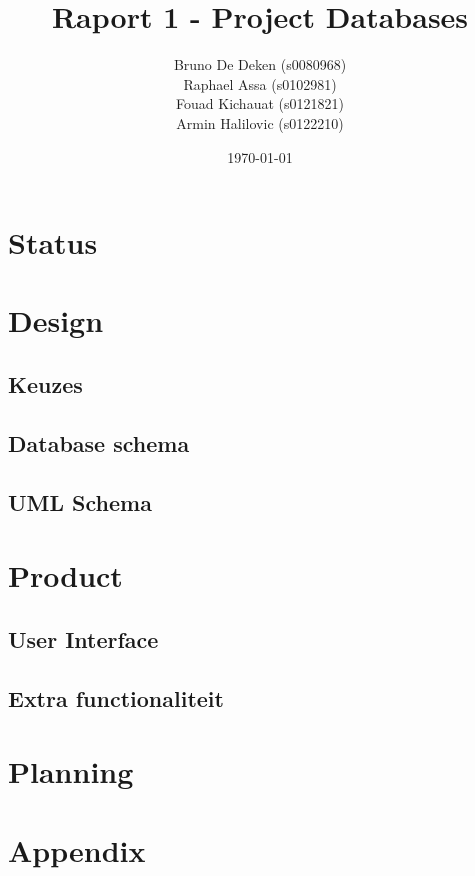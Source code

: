 \documentclass[12pt]{article}
\title{Raport 1 - Project Databases}
\author{
    Bruno De Deken (s0080968) \\
    Raphael Assa (s0102981) \\
    Fouad Kichauat (s0121821) \\
    Armin Halilovic (s0122210)
}
\date{\today}
\begin{document}
\maketitle
\clearpage

\tableofcontents
\clearpage

\section{Status}

\clearpage

\section{Design}
\subsection{Keuzes}

\subsection{Database schema}

\subsection{UML Schema}

\clearpage

\section{Product}
\subsection{User Interface}

\subsection{Extra functionaliteit}


\section{Planning}

\clearpage

\section{Appendix}

\clearpage
\end{document}
